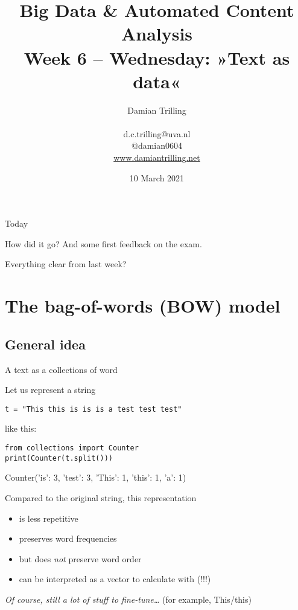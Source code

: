 \documentclass[compress]{beamer}
\title[Big Data and Automated Content Analysis]{\textbf{Big Data \& Automated Content Analysis} \\ Week 6 -- Wednesday: »Text as data«}
\author[Damian Trilling]{Damian Trilling \\ ~ \\ \footnotesize{d.c.trilling@uva.nl \\@damian0604} \\ \url{www.damiantrilling.net}}
\date{10 March 2021}
\institute[UvA]{Afdeling Communicatiewetenschap \\Universiteit van Amsterdam}
\begin{document}
	
	\begin{frame}{}
		\titlepage
	\end{frame}
	
	\begin{frame}{Today}
		\tableofcontents
	\end{frame}
	
	
\begin{frame}[standout]	
	How did it go? And some first feedback on the exam.
\end{frame}
	
	
	
	\begin{frame}[standout]	
		Everything clear from last week?
	\end{frame}
	
\section{The bag-of-words (BOW) model}

\subsection{General idea}

\begin{frame}[fragile]{A text as a collections of word}

Let us represent a string 
\begin{lstlisting}
t = "This this is is is a test test test"
\end{lstlisting}
like this:\\
\begin{lstlisting}
from collections import Counter
print(Counter(t.split()))
\end{lstlisting}
\begin{lstlistingoutput}
Counter({'is': 3, 'test': 3, 'This': 1, 'this': 1, 'a': 1})
\end{lstlistingoutput}

\pause 
Compared to the original string, this representation
\begin{itemize}
	\item is less repetitive
	\item preserves word frequencies
	\item but does \emph{not} preserve word order
	\item can be interpreted as a vector to calculate with (!!!)
\end{itemize}

\tiny{\emph{Of course, still a lot of stuff to fine-tune\ldots}  (for example, This/this)}
\end{frame}
\end{document}
